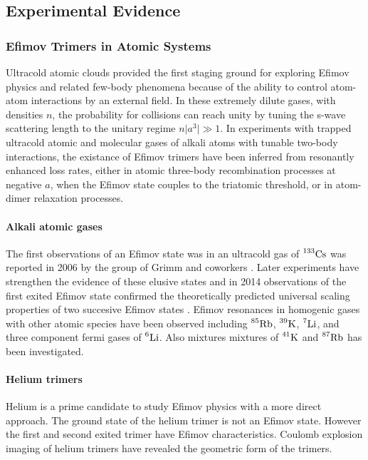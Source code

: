 \documentclass{article}
\providecommand{\abs}[1]{\lvert#1\rvert} \providecommand{\norm}[1]{\lVert#1\rVert}
\begin{document}
\subsection{Experimental Evidence}
\subsubsection{Efimov Trimers in Atomic Systems}
Ultracold atomic clouds provided the first staging ground for exploring Efimov physics and related few-body phenomena because of the ability to control atom-atom interactions by an external field. In these extremely dilute gases, with densities $n$, the probability for collisions can reach unity by tuning the s-wave scattering length to the unitary regime $n\abs{a^3}\gg1$. In experiments with trapped ultracold atomic and molecular gases of alkali atoms with tunable two-body interactions, the existance of Efimov trimers have been inferred from resonantly enhanced loss rates, either in atomic three-body recombination processes at negative $a$, when the Efimov state couples to the triatomic threshold, or in atom-dimer relaxation processes. 
\paragraph{Alkali atomic gases} 
The first observations of an Efimov state was in an ultracold gas of $\prescript{133}{}{\mathrm{Cs}}$ was reported in 2006 by the group of Grimm and coworkers \cite{Grimm:2006}. Later experiments have strengthen the evidence of these elusive states and in 2014 observations of the first exited Efimov state confirmed the theoretically predicted universal scaling properties of two succesive Efimov states \cite{Huang2014}. Efimov resonances in homogenic gases with other atomic species have been observed including $\prescript{85}{}{\mathrm{Rb}}$, $\prescript{39}{}{\mathrm{K}}$, $\prescript{7}{}{\mathrm{Li}}$, and three component fermi gases of $\prescript{6}{}{\mathrm{Li}}$. Also mixtures mixtures of $\prescript{41}{}{\mathrm{K}}$ and $\prescript{87}{}{\mathrm{Rb}}$ has been investigated.

\paragraph{Helium trimers}
Helium is a prime candidate to study Efimov physics with a more direct approach. The ground state of the helium trimer is not an Efimov state. However the first and second exited trimer have Efimov characteristics. Coulomb explosion imaging of helium trimers have revealed the geometric form of the trimers. \cite{Kunitski:2015qth}
\end{document}
